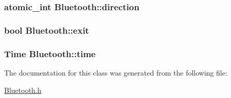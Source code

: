 \subsubsection[{\texorpdfstring{direction}{direction}}]{\setlength{\rightskip}{0pt plus 5cm}atomic\+\_\+int Bluetooth\+::direction\hspace{0.3cm}{\ttfamily [private]}}\hypertarget{classBluetooth_ad0f51dfcfb452953467ee9eec3801725}{}\label{classBluetooth_ad0f51dfcfb452953467ee9eec3801725}
\subsubsection[{\texorpdfstring{exit}{exit}}]{\setlength{\rightskip}{0pt plus 5cm}bool Bluetooth\+::exit\hspace{0.3cm}{\ttfamily [private]}}\hypertarget{classBluetooth_acca56b0089cf38cd2f2a4d0d7d330360}{}\label{classBluetooth_acca56b0089cf38cd2f2a4d0d7d330360}
\subsubsection[{\texorpdfstring{time}{time}}]{\setlength{\rightskip}{0pt plus 5cm}Time Bluetooth\+::time\hspace{0.3cm}{\ttfamily [private]}}\hypertarget{classBluetooth_a9bb41383c492dc0919dfa6d026bc718d}{}\label{classBluetooth_a9bb41383c492dc0919dfa6d026bc718d}


The documentation for this class was generated from the following file\+:\begin{DoxyCompactItemize}
\item 
\hyperlink{Bluetooth_8h}{Bluetooth.\+h}\end{DoxyCompactItemize}
